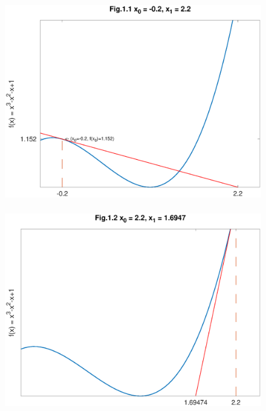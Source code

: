\documentclass[12pt]{article}
\begin{document}
\begin{figure}[htbp]
    \begin{center}
        \includegraphics[height=90mm]{octave-fig/Fig.1.1.eps}
        \includegraphics[height=90mm]{octave-fig/Fig.1.2.eps}
    \end{center}
\end{figure}
\end{document}
